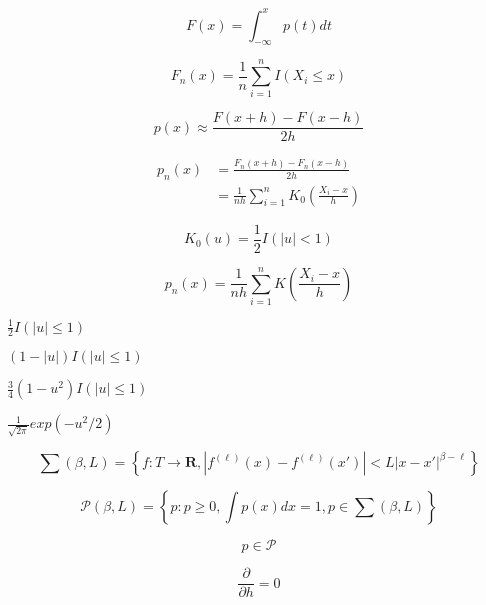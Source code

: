 \documentclass[12pt]{jarticle}
\begin{document}
\begin{equation}
F(x) = \int_{-\infty}^{x}p(t)dt
\end{equation}

\begin{equation}
F_{n}(x) = \frac{1}{n}\sum_{i=1}^{n}I(X_{i} \leq x)
\end{equation}

\begin{equation}
p(x) \approx \frac{F(x+h) - F(x-h)}{2h}
\end{equation}

\begin{align}
p_n(x) & = \frac{F_{n}(x+h) - F_{n}(x-h)}{2h} \\
        & = \frac{1}{nh}\sum_{i=1}^{n}K_0\left(\frac{X_{i} - x}{h}\right)
\end{align}

\begin{equation}
K_0(u) = \frac{1}{2}I(|u| < 1)
\end{equation}

\begin{equation}
p_n(x) = \frac{1}{nh}\sum_{i=1}^{n}K\left(\frac{X_{i} - x}{h}\right)
\end{equation}

\begin{description}[labelwidth=8em]
\item[rectangular]  $\frac{1}{2}I(|u| \leq 1)$
\item[triangular]   $(1 - |u|)I(|u| \leq 1)$
\item[Epanechnikov] $\frac{3}{4}(1-u^2)I(|u| \leq 1)$
\item[Gaussian] $\frac{1}{\sqrt{2\pi}}exp(-u^2/2)$
\end{description}

\begin{equation}
\sum(\beta, L) = \left\{f : T \rightarrow \textbf{R}, | f^{(\ell)}(x) - f^{(\ell)}(x')| < L|x-x'|^{\beta-\ell}\right\}
\end{equation}

\begin{equation}
\mathcal{P}(\beta, L) = \left\{p : p \geq 0, \int p(x)dx = 1, p \in \sum(\beta, L) \right\}
\end{equation}

\begin{equation}
p \in \mathcal{P}
\end{equation}

\begin{equation}
\frac{\partial}{\partial h} = 0
\end{equation}
\end{document}
